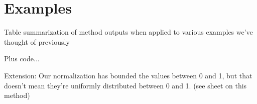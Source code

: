 \section{Examples}
\label{sec:gc:examples}

Table summarization of method outputs when applied to various examples we've 
thought of previously

Plus code...

Extension:
Our normalization has bounded the values between 0 and 1, but that doesn't mean 
they're uniformly distributed between 0 and 1. 
(see sheet on this method)